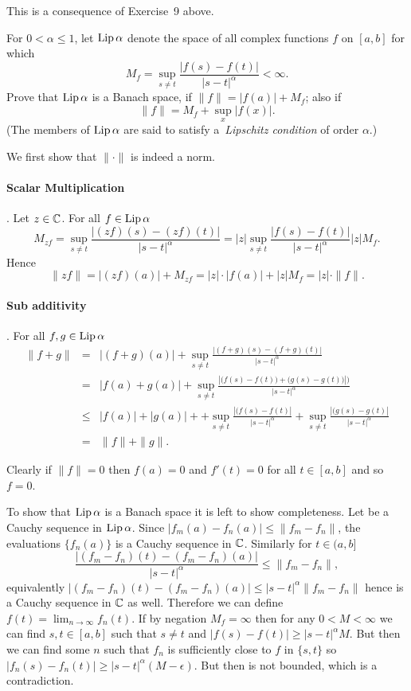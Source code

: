 \begin{enumerate}
This is a consequence of Exercise~9 above.

\begin{excopy}
For \(0<\alpha\leq 1\),
let \(\mathop{\rm Lip}\nolimits\alpha\) denote the space of all complex
functions $f$ on \([a,b]\) for which
\[M_f = \sup_{s\neq t} \frac{|f(s)-f(t)|}{|s-t|^\alpha} < \infty.\]
Prove  that \(\mathop{\rm Lip}\nolimits\alpha\) is a Banach space, if \(\|f\| = |f(a)| + M_f\);
also if
\[\|f\| = M_f + \sup_x |f(x)|.\]
(The members of \(\mathop{\rm Lip}\nolimits\alpha\) are said to satisfy
a~\emph{Lipschitz condition} of order \(\alpha\).)
\end{excopy}

We first show that \(\|\cdot\|\) is indeed a norm.
\paragraph{Scalar Multiplication}.
Let \(z\in\mathbb{C}\). For all \(f\in \mathop{\rm Lip}\nolimits\alpha\)
\[
M_{zf} 
= \sup_{s\neq t} \frac{|(zf)(s)-(zf)(t)|}{|s-t|^\alpha} 
= |z|\sup_{s\neq t} \frac{|f(s)-f(t)|}{|s-t|^\alpha} 
|z| M_f.\]
Hence
\[
\|zf\| = |(zf)(a)| + M_{zf} = |z|\cdot|f(a)| + |z|M_f = |z|\cdot\|f\|.
\]

\paragraph{Sub additivity}. For all \(f,g\in \mathop{\rm Lip}\nolimits\alpha\)
\begin{eqnarray*}
\|f+g\| 
&=& |(f+g)(a)| + \sup_{s\neq t} \frac{|(f+g)(s)-(f+g)(t)|}{|s-t|^\alpha} \\
&=& |f(a) + g(a)| + 
  \sup_{s\neq t} \frac{\left|\bigl(f(s)-f(t)\bigr) + 
                             \bigl(g(s)-g(t)\bigr)\right|)}{|s-t|^\alpha} \\
&\leq& |f(a)| + |g(a)| + 
     + \sup_{s\neq t} \frac{|(f(s)-f(t)|}{|s-t|^\alpha} 
     + \sup_{s\neq t} \frac{|(g(s)-g(t)|}{|s-t|^\alpha} \\
&=& \|f\|+\|g\|.
\end{eqnarray*}

Clearly if \(\|f\|=0\) then \(f(a)=0\) and \(f'(t)=0\) for all \(t\in [a,b]\)
and so \(f=0\).

To show that \(\mathop{\rm Lip}\nolimits\alpha\) is a Banach space it is left to show completeness.
Let  be a Cauchy sequence in \(\mathop{\rm Lip}\nolimits\alpha\).
Since \(|f_m(a)-f_n(a)| \leq \|f_m - f_n\|\), 
the evaluations \(\{f_n(a)\}\) is a Cauchy sequence in \(\mathbb{C}\).
Similarly for \(t\in(a,b]\)
\[
\frac{|(f_m - f_n)(t) - (f_m - f_n)(a)|}{|s-t|^\alpha} \leq \|f_m - f_n\|,\]
equivalently
\(|(f_m - f_n)(t) - (f_m - f_n)(a)| \leq |s-t|^\alpha \|f_m - f_n\|\)
hence  is a Cauchy sequence in \(\mathbb{C}\) as well.
Therefore we can define \(f(t) = \lim_{n\to\infty} f_n(t)\).
If by negation \(M_f = \infty\) then for any \(0<M<\infty\) we can find
\(s,t\in[a,b]\) such that \(s\neq t\) and \(|f(s)-f(t)|\geq |s-t|^\alpha M\).
But then we can find some $n$ such that \(f_n\) is sufficiently close 
to $f$ in \(\{s,t\}\) so \(|f_n(s)-f_n(t)|\geq |s-t|^\alpha (M-\epsilon)\).
But then  is not bounded, which is a contradiction.



\end{enumerate}
